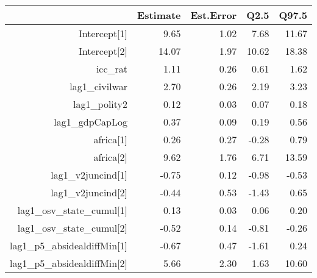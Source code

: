 \begin{table}[ht]
\centering
\begin{tabular}{rrrrr}
  \hline
 & Estimate & Est.Error & Q2.5 & Q97.5 \\ 
  \hline
Intercept[1] & 9.65 & 1.02 & 7.68 & 11.67 \\ 
  Intercept[2] & 14.07 & 1.97 & 10.62 & 18.38 \\ 
  icc\_rat & 1.11 & 0.26 & 0.61 & 1.62 \\ 
  lag1\_civilwar & 2.70 & 0.26 & 2.19 & 3.23 \\ 
  lag1\_polity2 & 0.12 & 0.03 & 0.07 & 0.18 \\ 
  lag1\_gdpCapLog & 0.37 & 0.09 & 0.19 & 0.56 \\ 
  africa[1] & 0.26 & 0.27 & -0.28 & 0.79 \\ 
  africa[2] & 9.62 & 1.76 & 6.71 & 13.59 \\ 
  lag1\_v2juncind[1] & -0.75 & 0.12 & -0.98 & -0.53 \\ 
  lag1\_v2juncind[2] & -0.44 & 0.53 & -1.43 & 0.65 \\ 
  lag1\_osv\_state\_cumul[1] & 0.13 & 0.03 & 0.06 & 0.20 \\ 
  lag1\_osv\_state\_cumul[2] & -0.52 & 0.14 & -0.81 & -0.26 \\ 
  lag1\_p5\_absidealdiffMin[1] & -0.67 & 0.47 & -1.61 & 0.24 \\ 
  lag1\_p5\_absidealdiffMin[2] & 5.66 & 2.30 & 1.63 & 10.60 \\ 
   \hline
\end{tabular}
\end{table}
